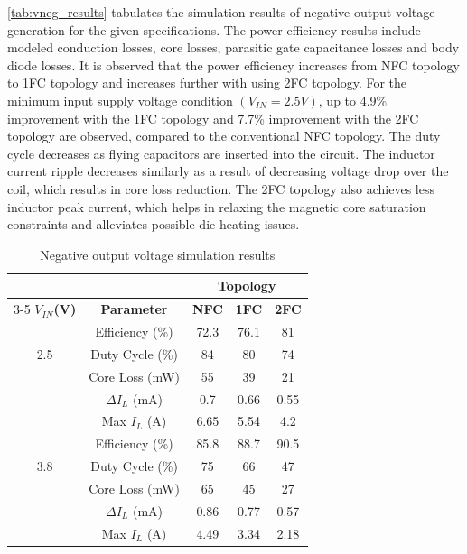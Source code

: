 \documentclass[conference,beamer]{IEEEtran}
\begin{document}
\autoref{tab:vneg_results} tabulates the simulation results of negative output voltage generation for the given specifications. The power efficiency results include modeled conduction losses, core losses, parasitic gate capacitance losses and body diode losses. It is observed that the power efficiency increases from NFC topology to 1FC topology and increases further with using 2FC topology. For the minimum input supply voltage condition $(V_{IN}=2.5V)$, up to 4.9\% improvement with the 1FC topology and 7.7\% improvement with the 2FC topology are observed, compared to the conventional NFC topology. The duty cycle decreases as flying capacitors are inserted into the circuit. The inductor current ripple decreases similarly as a result of decreasing voltage drop over the coil, which results in core loss reduction. The 2FC topology also achieves less inductor peak current, which helps in relaxing the magnetic core saturation constraints and alleviates possible die-heating issues. 

\begin{table}[!h]
\centering

\caption{Negative output voltage simulation results}
    \label{tab:vneg_results}
\begin{tabular}{c|c|ccc}

\multicolumn{1}{c}{} & \multicolumn{1}{c}{} & \multicolumn{3}{c}{\textbf{Topology}}  \\
\cmidrule(rl){3-5} 
\textbf{$V_{IN}$(V)} &\textbf{Parameter} & \textbf{NFC} & \textbf{1FC} & \textbf{2FC} \\
\midrule
\multirow{3}{*}{{2.5}}
 & Efficiency (\%) & 72.3 & 76.1 & 81  \\
 & Duty Cycle (\%) & 84 & 80 & 74  \\
 & Core Loss (mW) & 55 & 39 & 21 \\
 & $\Delta I_{L}$ (mA) & 0.7 & 0.66 & 0.55  \\
 & Max $I_{L}$ (A) & 6.65 & 5.54 & 4.2  \\
 \hline 
\multirow{3}{*}{{3.8}}
 & Efficiency (\%) & 85.8 & 88.7 & 90.5  \\
 & Duty Cycle (\%) & 75 & 66 & 47 \\
 & Core Loss (mW) & 65 & 45 &  27 \\
 & $\Delta I_{L}$ (mA) & 0.86 & 0.77 & 0.57  \\
 & Max $I_{L}$ (A) & 4.49 & 3.34 & 2.18  \\
\bottomrule
\end{tabular}
\end{table}
\end{document}
